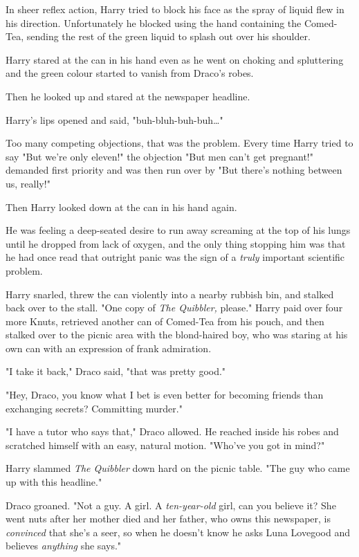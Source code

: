 In sheer reflex action, Harry tried to block his face as the spray of liquid
flew in his direction. Unfortunately he blocked using the hand containing the
Comed-Tea, sending the rest of the green liquid to splash out over his shoulder.

Harry stared at the can in his hand even as he went on choking and spluttering
and the green colour started to vanish from Draco's robes.

Then he looked up and stared at the newspaper headline.


Harry's lips opened and said, "buh-bluh-buh-buh{\ldots}"

Too many competing objections, that was the problem. Every time Harry tried to
say "But we're only eleven!" the objection "But men can't get pregnant!"
demanded first priority and was then run over by "But there's nothing between
us, really!"

Then Harry looked down at the can in his hand again.

He was feeling a deep-seated desire to run away screaming at the top of his
lungs until he dropped from lack of oxygen, and the only thing stopping him was
that he had once read that outright panic was the sign of a \emph{truly}
important scientific problem.

Harry snarled, threw the can violently into a nearby rubbish bin, and stalked
back over to the stall. "One copy of \emph{The Quibbler,} please." Harry paid
over four more Knuts, retrieved another can of Comed-Tea from his pouch, and
then stalked over to the picnic area with the blond-haired boy, who was staring
at his own can with an expression of frank admiration.

"I take it back," Draco said, "that was pretty good."

"Hey, Draco, you know what I bet is even better for becoming friends than
exchanging secrets? Committing murder."

"I have a tutor who says that," Draco allowed. He reached inside his robes and
scratched himself with an easy, natural motion. "Who've you got in mind?"

Harry slammed \emph{The Quibbler} down hard on the picnic table. "The guy who
came up with this headline."

Draco groaned. "Not a guy. A girl. A \emph{ten-year-old} girl, can you believe
it? She went nuts after her mother died and her father, who owns this
newspaper, is \emph{convinced} that she's a seer, so when he doesn't know he
asks Luna Lovegood and believes \emph{anything} she says."

